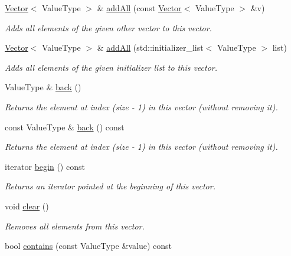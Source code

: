 \begin{DoxyCompactItemize}
\mbox{\hyperlink{classVector}{Vector}}$<$ Value\+Type $>$ \& \mbox{\hyperlink{classVector_a7e05c14d67a60defeb6723b5704967a6}{add\+All}} (const \mbox{\hyperlink{classVector}{Vector}}$<$ Value\+Type $>$ \&v)
\begin{DoxyCompactList}\small\item\em Adds all elements of the given other vector to this vector. \end{DoxyCompactList}\item 
\mbox{\hyperlink{classVector}{Vector}}$<$ Value\+Type $>$ \& \mbox{\hyperlink{classVector_a36067964c5c7f8b7934682f5c3be49c6}{add\+All}} (std\+::initializer\+\_\+list$<$ Value\+Type $>$ list)
\begin{DoxyCompactList}\small\item\em Adds all elements of the given initializer list to this vector. \end{DoxyCompactList}\item 
Value\+Type \& \mbox{\hyperlink{classVector_a2bad145b40a82c36986f67610313658d}{back}} ()
\begin{DoxyCompactList}\small\item\em Returns the element at index (size -\/ 1) in this vector (without removing it). \end{DoxyCompactList}\item 
const Value\+Type \& \mbox{\hyperlink{classVector_adc761c91bdacd01bed5c96e25fd9486a}{back}} () const
\begin{DoxyCompactList}\small\item\em Returns the element at index (size -\/ 1) in this vector (without removing it). \end{DoxyCompactList}\item 
iterator \mbox{\hyperlink{classVector_a0c62c15c8ed609e7e5e9518cf5f5c712}{begin}} () const
\begin{DoxyCompactList}\small\item\em Returns an iterator pointed at the beginning of this vector. \end{DoxyCompactList}\item 
void \mbox{\hyperlink{classVector_ac8bb3912a3ce86b15842e79d0b421204}{clear}} ()
\begin{DoxyCompactList}\small\item\em Removes all elements from this vector. \end{DoxyCompactList}\item 
bool \mbox{\hyperlink{classVector_a6fbc1a150987e7e5320d244a3baeb560}{contains}} (const Value\+Type \&value) const

\end{DoxyCompactItemize}
